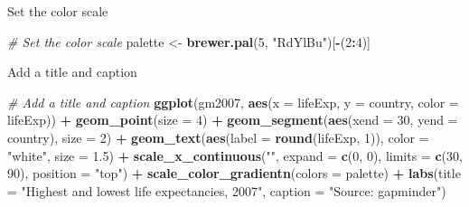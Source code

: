 \documentclass[
  ignorenonframetext,
]{beamer}
\newenvironment{Shaded}{\begin{snugshade}}{\end{snugshade}}
\newcommand{\AttributeTok}[1]{\textcolor[rgb]{0.13,0.29,0.53}{#1}}
\newcommand{\CommentTok}[1]{\textcolor[rgb]{0.56,0.35,0.01}{\textit{#1}}}
\newcommand{\DecValTok}[1]{\textcolor[rgb]{0.00,0.00,0.81}{#1}}
\newcommand{\FloatTok}[1]{\textcolor[rgb]{0.00,0.00,0.81}{#1}}
\newcommand{\FunctionTok}[1]{\textcolor[rgb]{0.13,0.29,0.53}{\textbf{#1}}}
\newcommand{\NormalTok}[1]{#1}
\newcommand{\OtherTok}[1]{\textcolor[rgb]{0.56,0.35,0.01}{#1}}
\newcommand{\SpecialCharTok}[1]{\textcolor[rgb]{0.81,0.36,0.00}{\textbf{#1}}}
\newcommand{\StringTok}[1]{\textcolor[rgb]{0.31,0.60,0.02}{#1}}
\begin{document}
\begin{frame}[fragile]{Set the color scale}
\label{set-the-color-scale-1}

\begin{Shaded}
\begin{Highlighting}[]
\CommentTok{\# Set the color scale}
\NormalTok{palette }\OtherTok{\textless{}{-}} \FunctionTok{brewer.pal}\NormalTok{(}\DecValTok{5}\NormalTok{, }\StringTok{"RdYlBu"}\NormalTok{)[}\SpecialCharTok{{-}}\NormalTok{(}\DecValTok{2}\SpecialCharTok{:}\DecValTok{4}\NormalTok{)]}
\end{Highlighting}
\end{Shaded}
\end{frame}

\begin{frame}[fragile]{Add a title and caption}
\label{add-a-title-and-caption}

\begin{Shaded}
\begin{Highlighting}[]
\CommentTok{\# Add a title and caption}
\FunctionTok{ggplot}\NormalTok{(gm2007, }\FunctionTok{aes}\NormalTok{(}\AttributeTok{x =}\NormalTok{ lifeExp, }\AttributeTok{y =}\NormalTok{ country, }\AttributeTok{color =}\NormalTok{ lifeExp)) }\SpecialCharTok{+}
    \FunctionTok{geom\_point}\NormalTok{(}\AttributeTok{size =} \DecValTok{4}\NormalTok{) }\SpecialCharTok{+} \FunctionTok{geom\_segment}\NormalTok{(}\FunctionTok{aes}\NormalTok{(}\AttributeTok{xend =} \DecValTok{30}\NormalTok{, }\AttributeTok{yend =}\NormalTok{ country),}
    \AttributeTok{size =} \DecValTok{2}\NormalTok{) }\SpecialCharTok{+} \FunctionTok{geom\_text}\NormalTok{(}\FunctionTok{aes}\NormalTok{(}\AttributeTok{label =} \FunctionTok{round}\NormalTok{(lifeExp, }\DecValTok{1}\NormalTok{)), }\AttributeTok{color =} \StringTok{"white"}\NormalTok{,}
    \AttributeTok{size =} \FloatTok{1.5}\NormalTok{) }\SpecialCharTok{+} \FunctionTok{scale\_x\_continuous}\NormalTok{(}\StringTok{""}\NormalTok{, }\AttributeTok{expand =} \FunctionTok{c}\NormalTok{(}\DecValTok{0}\NormalTok{, }\DecValTok{0}\NormalTok{), }\AttributeTok{limits =} \FunctionTok{c}\NormalTok{(}\DecValTok{30}\NormalTok{,}
    \DecValTok{90}\NormalTok{), }\AttributeTok{position =} \StringTok{"top"}\NormalTok{) }\SpecialCharTok{+} \FunctionTok{scale\_color\_gradientn}\NormalTok{(}\AttributeTok{colors =}\NormalTok{ palette) }\SpecialCharTok{+}
    \FunctionTok{labs}\NormalTok{(}\AttributeTok{title =} \StringTok{"Highest and lowest life expectancies, 2007"}\NormalTok{,}
        \AttributeTok{caption =} \StringTok{"Source: gapminder"}\NormalTok{)}
\end{Highlighting}
\end{Shaded}


\end{frame}
\end{document}

